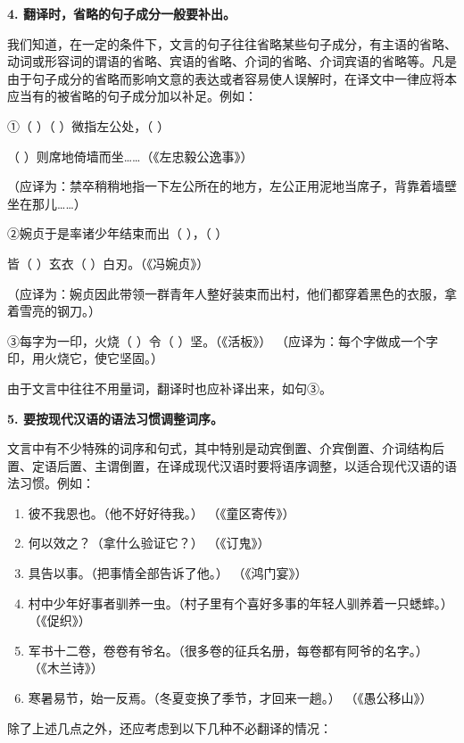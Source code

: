 \textbf{4. 翻译时，省略的句子成分一般要补出。}

我们知道，在一定的条件下，文言的句子往往省略某些句子成分，有主语的省略、动词或形容词的谓语的省略、宾语的省略、介词的省略、介词宾语的省略等。凡是由于句子成分的省略而影响文意的表达或者容易使人误解时，在译文中一律应将本应当有的被省略的句子成分加以补足。例如：

①（ ）（ ）微指左公处，（ ）

（ ）则席地倚墙而坐……（《左忠毅公逸事》）

（应译为：禁卒稍稍地指一下左公所在的地方，左公正用泥地当席子，背靠着墙壁坐在那儿……）

②婉贞于是率诸少年结束而出（ ），（ ）

皆（ ）玄衣（ ）白刃。（《冯婉贞》）

（应译为：婉贞因此带领一群青年人整好装束而出村，他们都穿着黑色的衣服，拿着雪亮的钢刀。）

③每字为一印，火烧（ ）令（ ）坚。（《活板》） （应译为：每个字做成一个字印，用火烧它，使它坚固。）

由于文言中往往不用量词，翻译时也应补译出来，如句③。

\textbf{5. 要按现代汉语的语法习惯调整词序。}

文言中有不少特殊的词序和句式，其中特别是动宾倒置、介宾倒置、介词结构后置、定语后置、主谓倒置，在译成现代汉语时要将语序调整，以适合现代汉语的语法习惯。例如：

\noindent
\begin{enumerate}[label=\textcircled{\arabic*}]
	\item 彼不我恩也。（他不好好待我。） （《童区寄传》）
	\item 何以效之？（拿什么验证它？） （《订鬼》）
	\item 具告以事。（把事情全部告诉了他。） （《鸿门宴》）
	\item 村中少年好事者驯养一虫。（村子里有个喜好多事的年轻人驯养着一只蟋蟀。） （《促织》）
	\item 军书十二卷，卷卷有爷名。（很多卷的征兵名册，每卷都有阿爷的名字。） （《木兰诗》）
	\item 寒暑易节，始一反焉。（冬夏变换了季节，才回来一趟。） （《愚公移山》）
\end{enumerate}

除了上述几点之外，还应考虑到以下几种不必翻译的情况：

